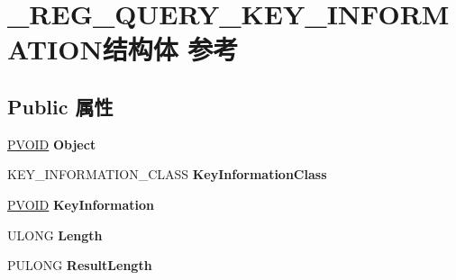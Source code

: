 \hypertarget{struct___r_e_g___q_u_e_r_y___k_e_y___i_n_f_o_r_m_a_t_i_o_n}{}\section{\+\_\+\+R\+E\+G\+\_\+\+Q\+U\+E\+R\+Y\+\_\+\+K\+E\+Y\+\_\+\+I\+N\+F\+O\+R\+M\+A\+T\+I\+O\+N结构体 参考}
\label{struct___r_e_g___q_u_e_r_y___k_e_y___i_n_f_o_r_m_a_t_i_o_n}
\subsection*{Public 属性}
\begin{DoxyCompactItemize}
\item 
\mbox{\label{struct___r_e_g___q_u_e_r_y___k_e_y___i_n_f_o_r_m_a_t_i_o_n_ae2cee565bc6b7c3f2bb051367c053178}} 
\hyperlink{interfacevoid}{P\+V\+O\+ID} {\bfseries Object}
\item 
\mbox{\label{struct___r_e_g___q_u_e_r_y___k_e_y___i_n_f_o_r_m_a_t_i_o_n_a9b6522869c4081cf99c184714e08173a}} 
K\+E\+Y\+\_\+\+I\+N\+F\+O\+R\+M\+A\+T\+I\+O\+N\+\_\+\+C\+L\+A\+SS {\bfseries Key\+Information\+Class}
\item 
\mbox{\label{struct___r_e_g___q_u_e_r_y___k_e_y___i_n_f_o_r_m_a_t_i_o_n_a535c2b9719641bcd5b7ad36685e1299a}} 
\hyperlink{interfacevoid}{P\+V\+O\+ID} {\bfseries Key\+Information}
\item 
\mbox{\label{struct___r_e_g___q_u_e_r_y___k_e_y___i_n_f_o_r_m_a_t_i_o_n_a4ecf986b94dab3d22c627fc471d4098b}} 
U\+L\+O\+NG {\bfseries Length}
\item 
\mbox{\label{struct___r_e_g___q_u_e_r_y___k_e_y___i_n_f_o_r_m_a_t_i_o_n_acd8356a840bc67fab92f3f085d82f8d5}} 
P\+U\+L\+O\+NG {\bfseries Result\+Length}
\item 
\mbox{\label{struct___r_e_g___q_u_e_r_y___k_e_y___i_n_f_o_r_m_a_t_i_o_n_a8220b667bc2464ec2223db997084b07d}} 

\end{DoxyCompactItemize}
